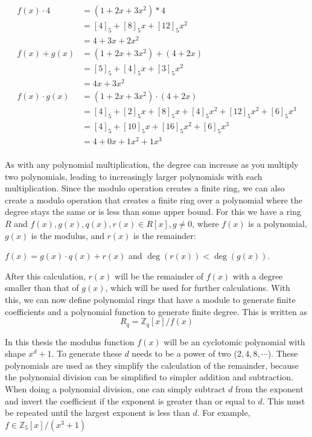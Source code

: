 \begin{align*}
  f(x)\cdot 4 & = (1+2x+3x^2) * 4                                 \\
           & = [4]_5+[8]_5x+[12]_5x^2                          \\
           & = 4+3x+2x^2                                       \\
  f(x)+g(x)      & = (1+2x+3x^2)+(4+2x)                              \\
           & = [5]_5+[4]_5x+[3]_5x^2                           \\
           & = 4x+3x^2                                         \\
  f(x)\cdot g(x) & = (1+2x+3x^2)\cdot(4+2x)                          \\ 
           & = [4]_5+[2]_5x+[8]_5x+[4]_5x^2+[12]_5x^2+[6]_5x^3 \\
           & = [4]_5+[10]_5x+[16]_5x^2+[6]_5x^3                \\
           & = 4+0x+1x^2+1x^3                                  \\
\end{align*}

As with any polynomial multiplication, the degree can increase as you multiply two polynomials, leading to increasingly larger polynomials with each multiplication. Since the modulo operation creates a finite ring, we can also create a modulo operation that creates a finite ring over a polynomial where the degree stays the same or is less than some upper bound. For this we have a ring $R$ and $f(x), g(x), q(x), r(x) \in R[x], g\neq 0$, where $f(x)$ is a polynomial, $g(x)$ is the modulus, and $r(x)$ is the remainder:
\begin{center}
  $f(x) = g(x)\cdot q(x) + r(x) $ and $\deg(r(x))<\deg(g(x))$.
\end{center}

After this calculation, $r(x)$ will be the remainder of $f(x)$ with a degree smaller than that of $g(x)$, which will be used for further calculations. With this, we can now define polynomial rings that have a module to generate finite coefficients and a polynomial function to generate finite degree. This is written as 
$$R_q = \mathbb{Z}_q[x]/f(x)$$


In this thesis the modulus function $f(x)$ will be an cyclotomic polynomial with shape $x^d+1$. To generate these $d$ needs to be a power of two ($2,4,8, \cdots$). These polynomials are used as they simplify the calculation of the remainder, because the polynomial division can be simplified to simpler addition and subtraction. When doing a polynomial division, one can simply subtract $d$ from the exponent and invert the coefficient if the exponent is greater than or equal to $d$. This must be repeated until the largest exponent is less than $d$. For example, $f \in \mathbb{Z}_5[x]/(x^3+1)$

